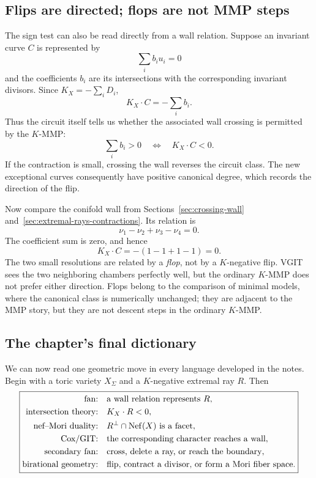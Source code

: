 \subsection{Flips are directed; flops are not MMP steps}

The sign test can also be read directly from a wall relation.  Suppose
an invariant curve \(C\) is represented by
\[
\sum_i b_i u_i=0
\]
and the coefficients \(b_i\) are its intersections with the
corresponding invariant divisors.  Since
\(K_X=-\sum_iD_i\),
\[
\boxed{
K_X\cdot C=-\sum_i b_i.}
\]
Thus the circuit itself tells us whether the associated wall crossing
is permitted by the \(K\)-MMP:
\[
\sum_i b_i>0
\quad\Longleftrightarrow\quad
K_X\cdot C<0.
\]
If the contraction is small, crossing the wall reverses the circuit
class.  The new exceptional curves consequently have positive
canonical degree, which records the direction of the flip.

Now compare the conifold wall from Sections~\ref{sec:crossing-wall}
and~\ref{sec:extremal-rays-contractions}.  Its relation is
\[
\nu_1-\nu_2+\nu_3-\nu_4=0.
\]
The coefficient sum is zero, and hence
\[
K_X\cdot C=-(1-1+1-1)=0.
\]
The two small resolutions are related by a \emph{flop}, not by a
\(K\)-negative flip.  VGIT sees the two neighboring chambers perfectly
well, but the ordinary \(K\)-MMP does not prefer either direction.
Flops belong to the comparison of minimal models, where the canonical
class is numerically unchanged; they are adjacent to the MMP story,
but they are not descent steps in the ordinary \(K\)-MMP.

\subsection{The chapter's final dictionary}

We can now read one geometric move in every language developed in the
notes.  Begin with a toric variety \(X_\Sigma\) and a \(K\)-negative
extremal ray \(R\).  Then
\[
\boxed{
\begin{aligned}
\text{fan:}\quad
&\text{a wall relation represents }R,
\\
\text{intersection theory:}\quad
&K_X\cdot R<0,
\\
\text{nef--Mori duality:}\quad
&R^\perp\cap\operatorname{Nef}(X)\text{ is a facet},
\\
\text{Cox/GIT:}\quad
&\text{the corresponding character reaches a wall},
\\
\text{secondary fan:}\quad
&\text{cross, delete a ray, or reach the boundary},
\\
\text{birational geometry:}\quad
&\text{flip, contract a divisor, or form a Mori fiber space.}
\end{aligned}}
\]

